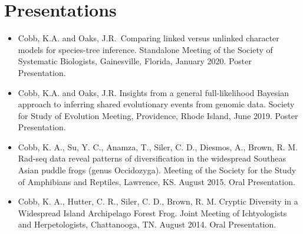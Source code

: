 \section*{Presentations}

\begin{itemize}[leftmargin=3em, label={}, itemindent=-2em]

\item Cobb, K.A. and Oaks, J.R. Comparing linked versus unlinked character models
for species-tree inference. Standalone Meeting of the Society of Systematic
Biologists, Gainesville, Florida, January 2020. Poster Presentation.

\item Cobb, K.A. and Oaks, J.R. Insights from a general full-likelihood Bayesian
approach to inferring shared evolutionary events from genomic data. Society for 
Study of Evolution Meeting, Providence, Rhode Island, June 2019. 
Poster Presentation.

\item Cobb, K. A., Su, Y. C., Anamza, T., Siler, C. D., Diesmos, A., Brown, R. M.
Rad-seq data reveal patterns of diversification in the widespread Southeas
Asian puddle frogs (genus Occidozyga). Meeting of the Society for the Study of 
Amphibians and Reptiles, Lawrence, KS. August 2015. Oral Presentation.

\item Cobb, K. A., Hutter, C. R., Siler, C. D., Brown, R. M. Cryptic Diversity
in a Widespread Island Archipelago Forest Frog. Joint Meeting of Ichtyologists 
and Herpetologists, Chattanooga, TN. August 2014. Oral Presentation.

\end{itemize}
